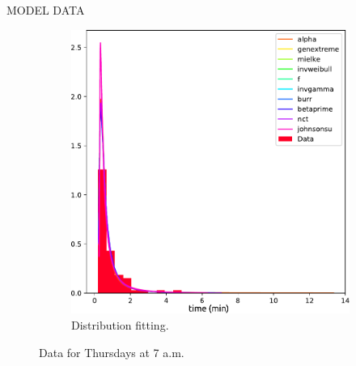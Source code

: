 \begin{frame}{MODEL DATA}
\begin{figure}[H]
\begin{subfigure}[b]{0.475\textwidth}
            \includegraphics[scale=0.3]{images/fitting.pdf}
            \caption{Distribution fitting.}
            \label{subfig:dist}
        \end{subfigure}
        \caption{Data for Thursdays at 7 a.m.}
        \label{fig:thu7}
	\end{figure}
\end{frame}
